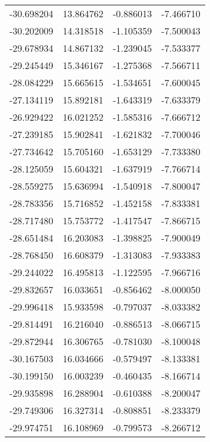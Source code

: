 \begin{tabular}{rrrr}
      -30.698204 &        13.864762 &   -0.886013 &  -7.466710 \\
      -30.202009 &        14.318518 &   -1.105359 &  -7.500043 \\
      -29.678934 &        14.867132 &   -1.239045 &  -7.533377 \\
      -29.245449 &        15.346167 &   -1.275368 &  -7.566711 \\
      -28.084229 &        15.665615 &   -1.534651 &  -7.600045 \\
      -27.134119 &        15.892181 &   -1.643319 &  -7.633379 \\
      -26.929422 &        16.021252 &   -1.585316 &  -7.666712 \\
      -27.239185 &        15.902841 &   -1.621832 &  -7.700046 \\
      -27.734642 &        15.705160 &   -1.653129 &  -7.733380 \\
      -28.125059 &        15.604321 &   -1.637919 &  -7.766714 \\
      -28.559275 &        15.636994 &   -1.540918 &  -7.800047 \\
      -28.783356 &        15.716852 &   -1.452158 &  -7.833381 \\
      -28.717480 &        15.753772 &   -1.417547 &  -7.866715 \\
      -28.651484 &        16.203083 &   -1.398825 &  -7.900049 \\
      -28.768450 &        16.608379 &   -1.313083 &  -7.933383 \\
      -29.244022 &        16.495813 &   -1.122595 &  -7.966716 \\
      -29.832657 &        16.033651 &   -0.856462 &  -8.000050 \\
      -29.996418 &        15.933598 &   -0.797037 &  -8.033382 \\
      -29.814491 &        16.216040 &   -0.886513 &  -8.066715 \\
      -29.872944 &        16.306765 &   -0.781030 &  -8.100048 \\
      -30.167503 &        16.034666 &   -0.579497 &  -8.133381 \\
      -30.199150 &        16.003239 &   -0.460435 &  -8.166714 \\
      -29.935898 &        16.288904 &   -0.610388 &  -8.200047 \\
      -29.749306 &        16.327314 &   -0.808851 &  -8.233379 \\
      -29.974751 &        16.108969 &   -0.799573 &  -8.266712 \\

\end{tabular}
